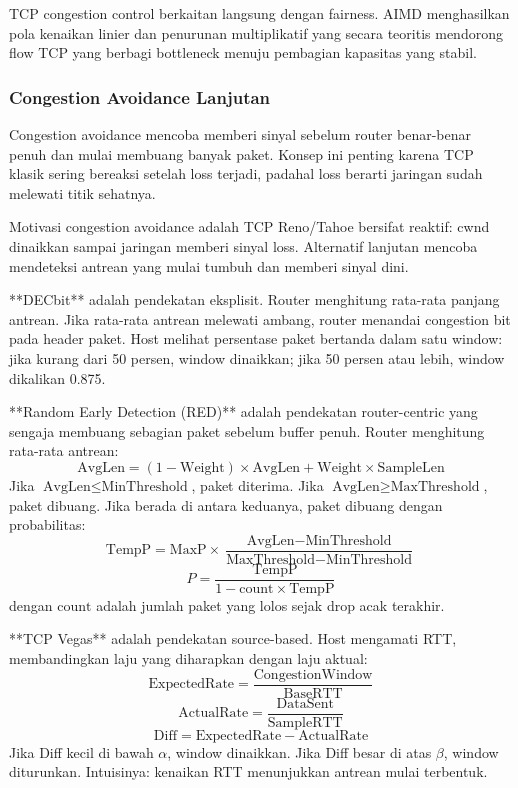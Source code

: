 TCP congestion control berkaitan langsung dengan fairness. AIMD menghasilkan pola kenaikan linier dan penurunan multiplikatif yang secara teoritis mendorong flow TCP yang berbagi bottleneck menuju pembagian kapasitas yang stabil.

\subsubsection{Congestion Avoidance Lanjutan}
\begin{jawab}
Congestion avoidance mencoba memberi sinyal sebelum router benar-benar penuh dan mulai membuang banyak paket. Konsep ini penting karena TCP klasik sering bereaksi setelah loss terjadi, padahal loss berarti jaringan sudah melewati titik sehatnya.
\end{jawab}

Motivasi congestion avoidance adalah TCP Reno/Tahoe bersifat reaktif: cwnd dinaikkan sampai jaringan memberi sinyal loss. Alternatif lanjutan mencoba mendeteksi antrean yang mulai tumbuh dan memberi sinyal dini.

**DECbit** adalah pendekatan eksplisit. Router menghitung rata-rata panjang antrean. Jika rata-rata antrean melewati ambang, router menandai congestion bit pada header paket. Host melihat persentase paket bertanda dalam satu window: jika kurang dari 50 persen, window dinaikkan; jika 50 persen atau lebih, window dikalikan 0.875.

**Random Early Detection (RED)** adalah pendekatan router-centric yang sengaja membuang sebagian paket sebelum buffer penuh. Router menghitung rata-rata antrean:
\[
    \text{AvgLen} =
    (1-\text{Weight})\times \text{AvgLen}
    + \text{Weight}\times \text{SampleLen}
\]
Jika $\text{AvgLen}\leq \text{MinThreshold}$, paket diterima. Jika $\text{AvgLen}\geq \text{MaxThreshold}$, paket dibuang. Jika berada di antara keduanya, paket dibuang dengan probabilitas:
\[
    \text{TempP} =
    \text{MaxP}
    \times
    \frac{\text{AvgLen}-\text{MinThreshold}}
    {\text{MaxThreshold}-\text{MinThreshold}}
\]
\[
    P =
    \frac{\text{TempP}}{1-\text{count}\times\text{TempP}}
\]
dengan $\text{count}$ adalah jumlah paket yang lolos sejak drop acak terakhir.

**TCP Vegas** adalah pendekatan source-based. Host mengamati RTT, membandingkan laju yang diharapkan dengan laju aktual:
\[
    \text{ExpectedRate} =
    \frac{\text{CongestionWindow}}{\text{BaseRTT}}
\]
\[
    \text{ActualRate} =
    \frac{\text{DataSent}}{\text{SampleRTT}}
\]
\[
    \text{Diff} = \text{ExpectedRate}-\text{ActualRate}
\]
Jika Diff kecil di bawah $\alpha$, window dinaikkan. Jika Diff besar di atas $\beta$, window diturunkan. Intuisinya: kenaikan RTT menunjukkan antrean mulai terbentuk.


